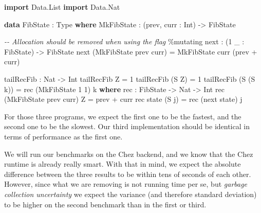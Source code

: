 \documentclass[
]{article}
\newenvironment{Shaded}{}{}
\newcommand{\CommentTok}[1]{\textcolor[rgb]{0.38,0.63,0.69}{\textit{#1}}}
\newcommand{\DataTypeTok}[1]{\textcolor[rgb]{0.56,0.13,0.00}{#1}}
\newcommand{\DecValTok}[1]{\textcolor[rgb]{0.25,0.63,0.44}{#1}}
\newcommand{\KeywordTok}[1]{\textcolor[rgb]{0.00,0.44,0.13}{\textbf{#1}}}
\newcommand{\NormalTok}[1]{#1}
\newcommand{\OperatorTok}[1]{\textcolor[rgb]{0.40,0.40,0.40}{#1}}
\newcommand{\OtherTok}[1]{\textcolor[rgb]{0.00,0.44,0.13}{#1}}
\begin{document}
\begin{Shaded}
\begin{Highlighting}[]
\KeywordTok{import} \DataTypeTok{Data.List}
\KeywordTok{import} \DataTypeTok{Data.Nat}

\KeywordTok{data} \DataTypeTok{FibState} \OperatorTok{:} \DataTypeTok{Type} \KeywordTok{where}
  \DataTypeTok{MkFibState} \OperatorTok{:}\NormalTok{ (prev, curr }\OperatorTok{:}  \DataTypeTok{Int}\NormalTok{) }\OtherTok{{-}\textgreater{}} \DataTypeTok{FibState}

\CommentTok{{-}{-} Allocation should be removed when using the flag}
\OperatorTok{\%}\NormalTok{mutating}
\NormalTok{next }\OperatorTok{:}\NormalTok{ (}\DecValTok{1}\NormalTok{ \_ }\OperatorTok{:} \DataTypeTok{FibState}\NormalTok{) }\OtherTok{{-}\textgreater{}} \DataTypeTok{FibState}
\NormalTok{next (}\DataTypeTok{MkFibState}\NormalTok{ prev curr) }\OtherTok{=} \DataTypeTok{MkFibState}\NormalTok{ curr (prev }\OperatorTok{+}\NormalTok{ curr)}

\NormalTok{tailRecFib }\OperatorTok{:} \DataTypeTok{Nat} \OtherTok{{-}\textgreater{}} \DataTypeTok{Int}
\NormalTok{tailRecFib }\DataTypeTok{Z} \OtherTok{=} \DecValTok{1}
\NormalTok{tailRecFib (}\DataTypeTok{S} \DataTypeTok{Z}\NormalTok{) }\OtherTok{=} \DecValTok{1}
\NormalTok{tailRecFib (}\DataTypeTok{S}\NormalTok{ (}\DataTypeTok{S}\NormalTok{ k)) }\OtherTok{=}\NormalTok{ rec (}\DataTypeTok{MkFibState} \DecValTok{1} \DecValTok{1}\NormalTok{) k}
  \KeywordTok{where}
\NormalTok{    rec }\OperatorTok{:} \DataTypeTok{FibState} \OtherTok{{-}\textgreater{}} \DataTypeTok{Nat} \OtherTok{{-}\textgreater{}} \DataTypeTok{Int}
\NormalTok{    rec (}\DataTypeTok{MkFibState}\NormalTok{ prev curr) }\DataTypeTok{Z} \OtherTok{=}\NormalTok{ prev }\OperatorTok{+}\NormalTok{ curr}
\NormalTok{    rec state (}\DataTypeTok{S}\NormalTok{ j) }\OtherTok{=}\NormalTok{ rec (next state) j}
\end{Highlighting}
\end{Shaded}

For those three programs, we expect the first one to be the fastest, and
the second one to be the slowest. Our third implementation should be
identical in terms of performance as the first one.

We will run our benchmarks on the Chez backend, and we know that the
Chez runtime is already really smart. With that in mind, we expect the
absolute difference between the three results to be within tens of
seconds of each other. However, since what we are removing is not
running time per se, but \emph{garbage collection uncertainty} we expect
the variance (and therefore standard deviation) to be higher on the
second benchmark than in the first or third.
\end{document}
